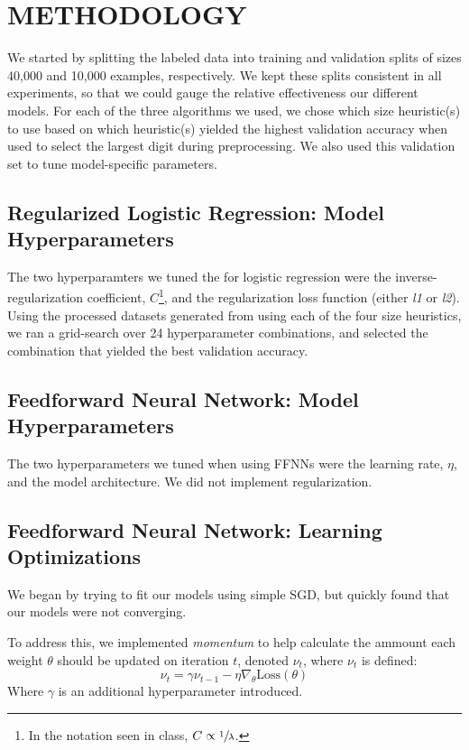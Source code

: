 \documentclass[letterpaper, 10 pt, conference]{ieeeconf}
\begin{document}
\section{METHODOLOGY}

We started by splitting the labeled data into training and validation splits of sizes 40,000 and 10,000 examples, respectively. We kept these splits consistent in all experiments, so that we could gauge the relative effectiveness our different models. For each of the three algorithms we used, we chose which size heuristic(s) to use based on which heuristic(s) yielded the highest validation accuracy when used to select the largest digit during preprocessing. We also used this validation set to tune model-specific parameters.

\subsection{Regularized Logistic Regression: Model Hyperparameters} 

The two hyperparamters we tuned the for logistic regression were the inverse-regularization coefficient, $C$\footnote{In the notation seen in class, $C \propto \sfrac{1}{\lambda}$.}, and the regularization loss function (either \emph{l1} or \emph{l2}). Using the processed datasets generated from using each of the four size heuristics, we ran a grid-search over 24 hyperparameter combinations, and selected the combination that yielded the best validation accuracy.   

\subsection{Feedforward Neural Network: Model Hyperparameters} 

The two hyperparameters we tuned when using FFNNs were the learning rate, $\eta$, and the model architecture. We did not implement regularization.

\subsection{Feedforward Neural Network: Learning Optimizations} 

We began by trying to fit our models using simple SGD, but quickly found that our models were not converging. 

To address this, we implemented \emph{momentum} to help calculate the ammount each weight $\theta$ should be updated on iteration $t$, denoted $\nu_t$, where $\nu_t$ is defined:
$$
\nu_t = \gamma\nu_{t-1} - \eta\nabla_{\theta}\text{Loss}(\theta)
$$
Where $\gamma$ is an additional hyperparameter introduced. 
\end{document}
